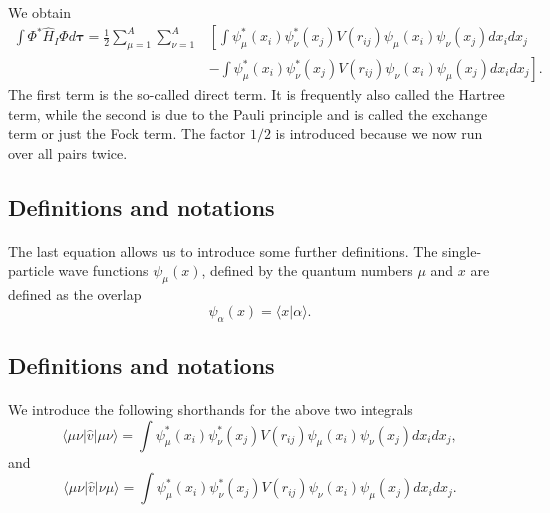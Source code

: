 \documentclass[%
twoside,                 %
final,                   %
10pt]{article}
\begin{document}
\paragraph{}
We obtain
\begin{equation}
\begin{split}
  \int \Phi^*\hat{H}_I\Phi d\mathbf{\tau} 
  = \frac{1}{2}\sum_{\mu=1}^A\sum_{\nu=1}^A
    &\left[ \int \psi_{\mu}^*(x_i)\psi_{\nu}^*(x_j)V(r_{ij})\psi_{\mu}(x_i)\psi_{\nu}(x_j)
    dx_idx_j \right.\\
  &\left.
  - \int \psi_{\mu}^*(x_i)\psi_{\nu}^*(x_j)
  V(r_{ij})\psi_{\nu}(x_i)\psi_{\mu}(x_j)
  dx_idx_j
  \right]. \label{H2Expectation}
\end{split}
\end{equation}
The first term is the so-called direct term. It is frequently also called the  Hartree term, 
while the second is due to the Pauli principle and is called
the exchange term or just the Fock term.
The factor  $1/2$ is introduced because we now run over
all pairs twice.



\subsection*{Definitions and notations}

\paragraph{}
The last equation allows us to  introduce some further definitions.  
The single-particle wave functions $\psi_{\mu}(x)$, defined by the quantum numbers $\mu$ and $x$
are defined as the overlap 
\[
   \psi_{\alpha}(x)  = \langle x | \alpha \rangle .
\]



\subsection*{Definitions and notations}

\paragraph{}
We introduce the following shorthands for the above two integrals
\[
\langle \mu\nu|\hat{v}|\mu\nu\rangle =  \int \psi_{\mu}^*(x_i)\psi_{\nu}^*(x_j)V(r_{ij})\psi_{\mu}(x_i)\psi_{\nu}(x_j)
    dx_idx_j,
\]
and
\[
\langle \mu\nu|\hat{v}|\nu\mu\rangle = \int \psi_{\mu}^*(x_i)\psi_{\nu}^*(x_j)
  V(r_{ij})\psi_{\nu}(x_i)\psi_{\mu}(x_j)
  dx_idx_j.  
\]
\end{document}
